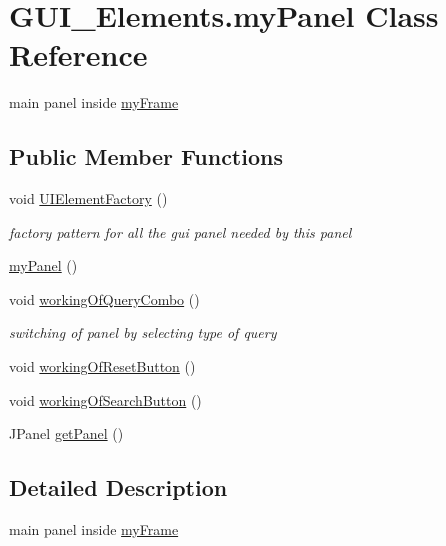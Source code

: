 \hypertarget{class_g_u_i___elements_1_1my_panel}{}\section{G\+U\+I\+\_\+\+Elements.\+my\+Panel Class Reference}
\label{class_g_u_i___elements_1_1my_panel}


main panel inside \hyperlink{class_g_u_i___elements_1_1my_frame}{my\+Frame}  


\subsection*{Public Member Functions}
\begin{DoxyCompactItemize}
\item 
void \hyperlink{class_g_u_i___elements_1_1my_panel_a0e7ebb816b28db3b3ee0af444afc7b32}{U\+I\+Element\+Factory} ()
\begin{DoxyCompactList}\small\item\em factory pattern for all the gui panel needed by this panel \end{DoxyCompactList}\item 
\hyperlink{class_g_u_i___elements_1_1my_panel_a86c5274d56125927194bdb681d40a3bc}{my\+Panel} ()
\item 
void \hyperlink{class_g_u_i___elements_1_1my_panel_a35817f482730797326227422f83ff9c8}{working\+Of\+Query\+Combo} ()
\begin{DoxyCompactList}\small\item\em switching of panel by selecting type of query \end{DoxyCompactList}\item 
void \hyperlink{class_g_u_i___elements_1_1my_panel_af937a1f734205a826ab7280987c2c420}{working\+Of\+Reset\+Button} ()
\item 
void \hyperlink{class_g_u_i___elements_1_1my_panel_a96d27ef92b9ddceade03b7094e0aefba}{working\+Of\+Search\+Button} ()
\item 
J\+Panel \hyperlink{class_g_u_i___elements_1_1my_panel_abea57f39e7c7b1c89db73d173d71d978}{get\+Panel} ()
\end{DoxyCompactItemize}


\subsection{Detailed Description}
main panel inside \hyperlink{class_g_u_i___elements_1_1my_frame}{my\+Frame} 

